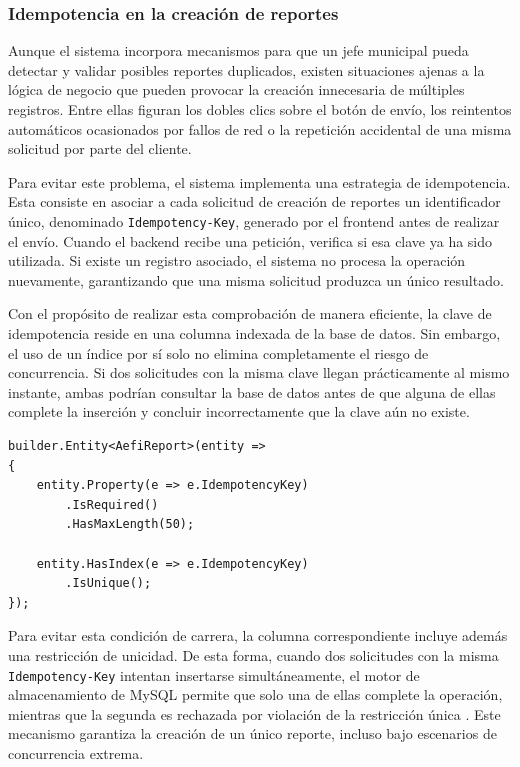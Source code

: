 \subsubsection{Idempotencia en la creación de reportes}

Aunque el sistema incorpora mecanismos para que un jefe municipal pueda detectar y validar posibles reportes duplicados, existen situaciones ajenas a la lógica de negocio que pueden provocar la creación innecesaria de múltiples registros. 
Entre ellas figuran los dobles clics sobre el botón de envío, los reintentos automáticos ocasionados por fallos de red o la repetición accidental de una misma solicitud por parte del cliente.

Para evitar este problema, el sistema implementa una estrategia de idempotencia.
Esta consiste en asociar a cada solicitud de creación de reportes un identificador único, denominado \texttt{Idempotency-Key}, generado por el frontend antes de realizar el envío. 
Cuando el backend recibe una petición, verifica si esa clave ya ha sido utilizada. 
Si existe un registro asociado, el sistema no procesa la operación nuevamente, garantizando que una misma solicitud produzca un único resultado.

Con el propósito de realizar esta comprobación de manera eficiente, la clave de idempotencia reside en una columna indexada de la base de datos. 
Sin embargo, el uso de un índice por sí solo no elimina completamente el riesgo de concurrencia. Si dos solicitudes con la misma clave llegan prácticamente al mismo instante, ambas podrían consultar la base de datos antes de que alguna de ellas complete la inserción y concluir incorrectamente que la clave aún no existe.

\begin{lstlisting}[language={[Sharp]C}, caption={Definición de la clave de idempotencia}, label={lst}]
builder.Entity<AefiReport>(entity =>
{
    entity.Property(e => e.IdempotencyKey)
        .IsRequired()
        .HasMaxLength(50);

    entity.HasIndex(e => e.IdempotencyKey)
        .IsUnique();
});
\end{lstlisting}

Para evitar esta condición de carrera, la columna correspondiente incluye además una restricción de unicidad. 
De esta forma, cuando dos solicitudes con la misma \texttt{Idempotency-Key} intentan insertarse simultáneamente, el motor de almacenamiento de MySQL permite que solo una de ellas complete la operación, mientras que la segunda es rechazada por violación de la restricción única \cite{mysql_isolation}. 
Este mecanismo garantiza la creación de un único reporte, incluso bajo escenarios de concurrencia extrema.

